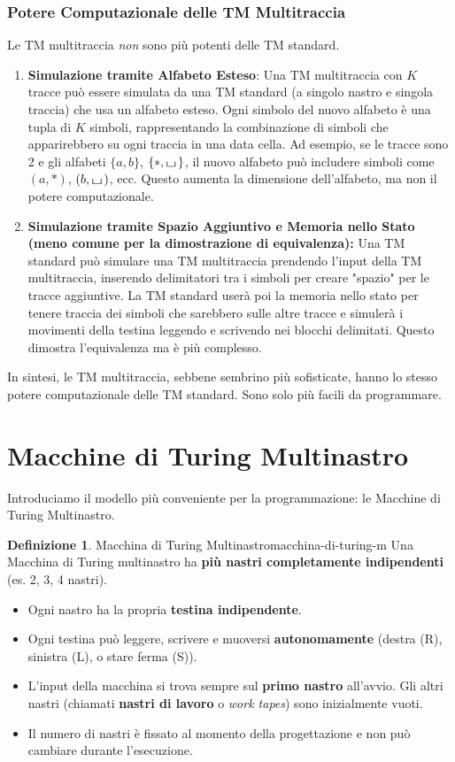 \documentclass[a4paper]{article}
\theoremstyle{definition} %
\newtheorem{definition}{Definizione}
\newcommand{\blankS}{\ensuremath{\raisebox{-0.15ex}{\scalebox{1.3}[0.7]{$\sqcup$}}\mkern2mu}}
\begin{document}
\subsubsection{Potere Computazionale delle TM Multitraccia}
Le TM multitraccia \emph{non} sono più potenti delle TM standard.
\begin{enumerate}
    \item \textbf{Simulazione tramite Alfabeto Esteso}:
    Una TM multitraccia con $K$ tracce può essere simulata da una TM standard (a singolo nastro e singola traccia) che usa un alfabeto esteso. Ogni simbolo del nuovo alfabeto è una tupla di $K$ simboli, rappresentando la combinazione di simboli che apparirebbero su ogni traccia in una data cella. Ad esempio, se le tracce sono 2 e gli alfabeti $\{a,b\}$, $\{*, \blankS\}$, il nuovo alfabeto può includere simboli come $(a, *)$, $(b, \blankS)$, ecc. Questo aumenta la dimensione dell'alfabeto, ma non il potere computazionale.
    \item \textbf{Simulazione tramite Spazio Aggiuntivo e Memoria nello Stato (meno comune per la dimostrazione di equivalenza):}
    Una TM standard può simulare una TM multitraccia prendendo l'input della TM multitraccia, inserendo delimitatori tra i simboli per creare "spazio" per le tracce aggiuntive. La TM standard userà poi la memoria nello stato per tenere traccia dei simboli che sarebbero sulle altre tracce e simulerà i movimenti della testina leggendo e scrivendo nei blocchi delimitati. Questo dimostra l'equivalenza ma è più complesso.
\end{enumerate}
In sintesi, le TM multitraccia, sebbene sembrino più sofisticate, hanno lo stesso potere computazionale delle TM standard. Sono solo più facili da programmare.

\section{Macchine di Turing Multinastro}
Introduciamo il modello più conveniente per la programmazione: le Macchine di Turing Multinastro.

\begin{definition}{Macchina di Turing Multinastro}{macchina-di-turing-m}
Una Macchina di Turing multinastro ha \textbf{più nastri completamente indipendenti} (es. 2, 3, 4 nastri).
\begin{itemize}
    \item Ogni nastro ha la propria \textbf{testina indipendente}.
    \item Ogni testina può leggere, scrivere e muoversi \textbf{autonomamente} (destra (R), sinistra (L), o stare ferma (S)).
    \item L'input della macchina si trova sempre sul \textbf{primo nastro} all'avvio. Gli altri nastri (chiamati \textbf{nastri di lavoro} o \emph{work tapes}) sono inizialmente vuoti.
    \item Il numero di nastri è fissato al momento della progettazione e non può cambiare durante l'esecuzione.
\end{itemize}
\end{definition}
\end{document}
